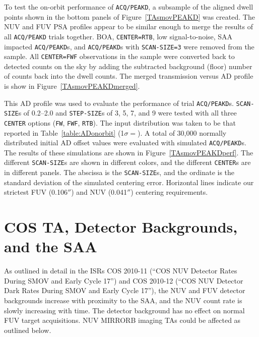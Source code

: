 \documentclass[12pt]{article}
\newcommand{\arcsec}{\ensuremath{''}}
\begin{document}
To test the on-orbit performance of \texttt{ACQ/PEAKD}, a subsample of the aligned dwell points
shown in the bottom panels of Figure~\ref{TAsmovPEAKD} was created.
The NUV and FUV PSA profiles appear to be similar enough to merge the results of all \texttt{ACQ/PEAKD}
trials together. BOA, \texttt{CENTER=RTB}, low signal-to-noise, SAA impacted \texttt{ACQ/PEAKD}s,
and \texttt{ACQ/PEAKD}s with \texttt{SCAN-SIZE=3} were removed from the sample.
All \texttt{CENTER=FWF} observations in the sample were converted back to detected counts on the sky
by adding the subtracted background (floor) number of counts back into the dwell counts.
The merged transmission versus AD profile is show in Figure~\ref{TAsmovPEAKDmerged}.

This AD profile was used to evaluate the performance of trial \texttt{ACQ/PEAKD}s.
\texttt{SCAN-SIZE}s of 0.2--2.0 and \texttt{STEP-SIZE}s of 3, 5, 7, and 9 were
tested with all three \texttt{CENTER} options (\texttt{FW}, \texttt{FWF}, \texttt{RTB}).
The input distribution was taken to be that reported in Table~\ref{table:ADonorbit} (1$\sigma=$\avgPEAKDonesig).
A total of 30,000 normally distributed initial AD offset values were evaluated with simulated \texttt{ACQ/PEAKD}s.
The results of these simulations are shown in Figure~\ref{TAsmovPEAKDperf}. The different
 \texttt{SCAN-SIZE}s are shown in different colors, and the different \texttt{CENTER}s are in
different panels. The abscissa is the \texttt{SCAN-SIZE}s, and the ordinate is the standard
deviation of the simulated centering error. Horizontal lines indicate our strictest FUV (0.106\arcsec)
and NUV (0.041\arcsec) centering requirements.

\clearpage
\vspace{-0.3cm}
\section{COS TA, Detector Backgrounds, and the SAA}\label{sec:TAback}
As outlined in detail in the ISRs COS 2010-11 (``COS NUV Detector Rates During SMOV and Early Cycle 17'') and
COS 2010-12 (``COS NUV Detector Dark Rates During SMOV and Early Cycle 17''),
the NUV and FUV detector backgrounds increase with proximity to the SAA, and the NUV count rate is slowly increasing with time.
The detector background has no effect on normal FUV target acquisitions.
NUV MIRRORB imaging TAs could be affected as outlined below.
\end{document}
